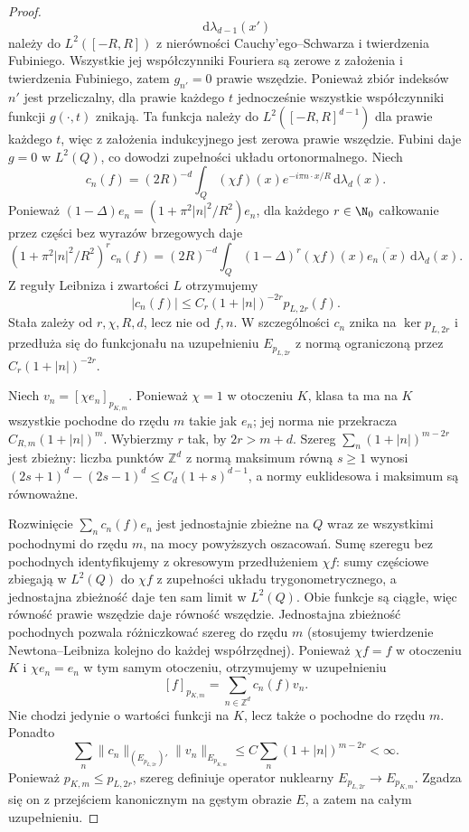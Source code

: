 \begin{proof}
\[ \,\mathrm d\lambda_{d-1}(x')
\]
należy do $L^2([-R,R])$ z nierówności
Cauchy'ego--Schwarza i twierdzenia Fubiniego.
Wszystkie jej współczynniki Fouriera są zerowe
z założenia i twierdzenia Fubiniego, zatem $g_{n'}=0$
prawie wszędzie. Ponieważ zbiór indeksów $n'$ jest
przeliczalny, dla prawie każdego $t$ jednocześnie
wszystkie współczynniki funkcji $g(\cdot,t)$ znikają.
Ta funkcja należy do $L^2([-R,R]^{d-1})$ dla prawie
każdego $t$, więc z założenia indukcyjnego jest zerowa
prawie wszędzie. Fubini daje $g=0$ w $L^2(Q)$,
co dowodzi zupełności układu ortonormalnego.
Niech
\[
 c_n(f)=(2R)^{-d}\int_Q(\chi f)(x)
 e^{-i\pi n\cdot x/R}\,\mathrm d\lambda_d(x).
\]
Ponieważ $(1-\Delta)e_n=(1+\pi^2|n|^2/R^2)e_n$,
dla każdego $r\in\N_0$ całkowanie przez części
bez wyrazów brzegowych daje
\[
 (1+\pi^2|n|^2/R^2)^r c_n(f)
 =(2R)^{-d}\int_Q (1-\Delta)^r(\chi f)(x)
 \overline{e_n(x)}\,\mathrm d\lambda_d(x).
\]
Z reguły Leibniza i zwartości $L$ otrzymujemy
\[
 |c_n(f)|\le C_r(1+|n|)^{-2r}p_{L,2r}(f).
\]
Stała zależy od $r,\chi,R,d$, lecz nie od $f,n$.
W szczególności $c_n$ znika na $\ker p_{L,2r}$
i przedłuża się do funkcjonału na uzupełnieniu
$E_{p_{L,2r}}$ z normą ograniczoną przez
$C_r(1+|n|)^{-2r}$.

Niech $v_n=[\chi e_n]_{p_{K,m}}$.
Ponieważ $\chi=1$ w otoczeniu $K$, klasa ta ma
na $K$ wszystkie pochodne do rzędu $m$ takie jak $e_n$;
jej norma nie przekracza $C_{R,m}(1+|n|)^m$.
Wybierzmy $r$ tak, by $2r>m+d$.
Szereg $\sum_n (1+|n|)^{m-2r}$ jest zbieżny:
liczba punktów $\mathbb Z^d$ z normą maksimum równą
$s\ge1$ wynosi $(2s+1)^d-(2s-1)^d
\le C_d(1+s)^{d-1}$, a normy euklidesowa i maksimum
są równoważne.

Rozwinięcie $\sum_n c_n(f)e_n$ jest jednostajnie
zbieżne na $Q$ wraz ze wszystkimi pochodnymi do rzędu
$m$, na mocy powyższych oszacowań.
Sumę szeregu bez pochodnych identyfikujemy z okresowym
przedłużeniem $\chi f$: sumy częściowe zbiegają
w $L^2(Q)$ do $\chi f$ z zupełności układu
trygonometrycznego, a jednostajna zbieżność daje
ten sam limit w $L^2(Q)$. Obie funkcje są ciągłe,
więc równość prawie wszędzie daje równość wszędzie.
Jednostajna zbieżność pochodnych pozwala różniczkować
szereg do rzędu $m$ (stosujemy twierdzenie
Newtona--Leibniza kolejno do każdej współrzędnej).
Ponieważ $\chi f=f$ w otoczeniu $K$ i $\chi e_n=e_n$
w tym samym otoczeniu, otrzymujemy w uzupełnieniu
\[
 [f]_{p_{K,m}}=\sum_{n\in\mathbb Z^d}c_n(f)v_n.
\]
Nie chodzi jedynie o wartości funkcji na $K$,
lecz także o pochodne do rzędu $m$.
Ponadto
\[
 \sum_n\|c_n\|_{(E_{p_{L,2r}})'}\|v_n\|_{E_{p_{K,m}}}
 \le C\sum_n(1+|n|)^{m-2r}<\infty.
\]
Ponieważ $p_{K,m}\le p_{L,2r}$, szereg definiuje
operator nuklearny $E_{p_{L,2r}}\to E_{p_{K,m}}$.
Zgadza się on z przejściem kanonicznym na gęstym
obrazie $E$, a zatem na całym uzupełnieniu.


\end{proof}
